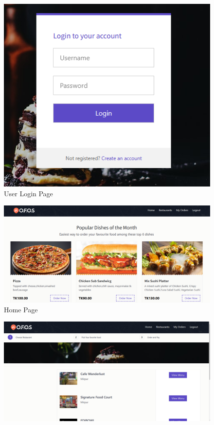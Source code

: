 {{\begin{figure}[h]
    \centering
    \includegraphics[scale=0.55]{user1.png}
    \caption{User Login Page}
    \label{fig.c}
\end{figure}\begin{figure}[h]
    \centering
    \includegraphics[scale=0.55]{user2.png}
    \caption{Home Page}
    \label{fig.d}
\end{figure}\begin{figure}[h]
    \centering
    \includegraphics[scale=0.55]{user3.png}

\end{figure}}}
